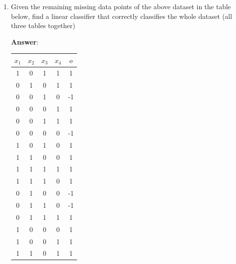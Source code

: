 \documentclass{article}
\begin{document}
\begin{enumerate}
    \item Given the remaining missing data points of the above dataset in the table below, find a linear classifier that correctly classifies the whole dataset (all three tables together)
    
    \textbf{Answer}:
    
    \begin{table}[h]
            \centering
            \begin{tabular}{cccc|c}
            $x_1$ & $x_2$ & $x_3$ & $x_4$ & $o$  \\ \hline
            1  & 0  & 1  & 1  & 1  \\
            0  & 1  & 0  & 1  & 1  \\
            0  & 0  & 1  & 0  & -1 \\
            0  & 0  & 0  & 1  & 1  \\
            0  & 0  & 1  & 1  & 1  \\
            0  & 0  & 0  & 0  & -1 \\
            1  & 0  & 1  & 0  & 1  \\
            1  & 1  & 0  & 0  & 1  \\
            1  & 1  & 1  & 1  & 1  \\
            1  & 1  & 1  & 0  & 1  \\
            0  & 1  & 0  & 0  & -1 \\
            0  & 1  & 1  & 0  & -1 \\
            0  & 1  & 1  & 1  & 1  \\
            1  & 0  & 0  & 0  & 1  \\
            1  & 0  & 0  & 1  & 1  \\
            1  & 1  & 0  & 1  & 1  \\
            \end{tabular}
        \end{table}
        

\end{enumerate}
\end{document}
